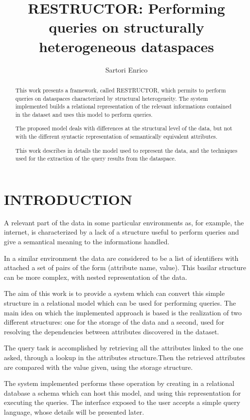 \documentclass{acm_proc_article-sp-sigmod07}
\begin{document}
\title{RESTRUCTOR: Performing queries on structurally heterogeneous
dataspaces}
\author{Sartori Enrico}
\maketitle

\begin{abstract}
This work presents a framework, called RESTRUCTOR, which permits to
perform queries on dataspaces characterized by structural heterogeneity.
The system implemented builds a relational representation of the relevant
informations contained in the dataset and uses this model to perform
queries.

The proposed model deals with differences at the structural level of the
data, but not with the different syntactic representation of semantically
equivalent attributes.

This work describes in details the model used to represent the data, and
the techniques used for the extraction of the query results from the
dataspace.
\end{abstract}

\section{INTRODUCTION}
A relevant part of the data in some particular environments as, for
example, the internet, is characterized by a lack of a structure useful
to perform queries and give a semantical meaning to the informations
handled.

In a similar environment the data are considered to be a list of
identifiers with attached a set of pairs of the form (attribute name,
value). This basilar structure can be more complex, with nested
representation of the data.

The aim of this work is to provide a system which can convert this simple
structure in a relational model which can be used for performing queries.
The main idea on which the implemented approach is based is the
realization of two different structures: one for the storage of the data
and a second, used for resolving the dependencies between attributes
discovered in the dataset.

The query task is accomplished by retrieving all the attributes linked to
the one asked, through a lookup in the attributes structure.Then the
retrieved attributes are compared with the value given, using the storage
structure.

The system implemented performs these operation by creating in a
relational database a schema which can host this model, and using this
representation for executing the queries.
The interface exposed to the user accepts a simple query language, whose
details will be presented later.
\end{document}
